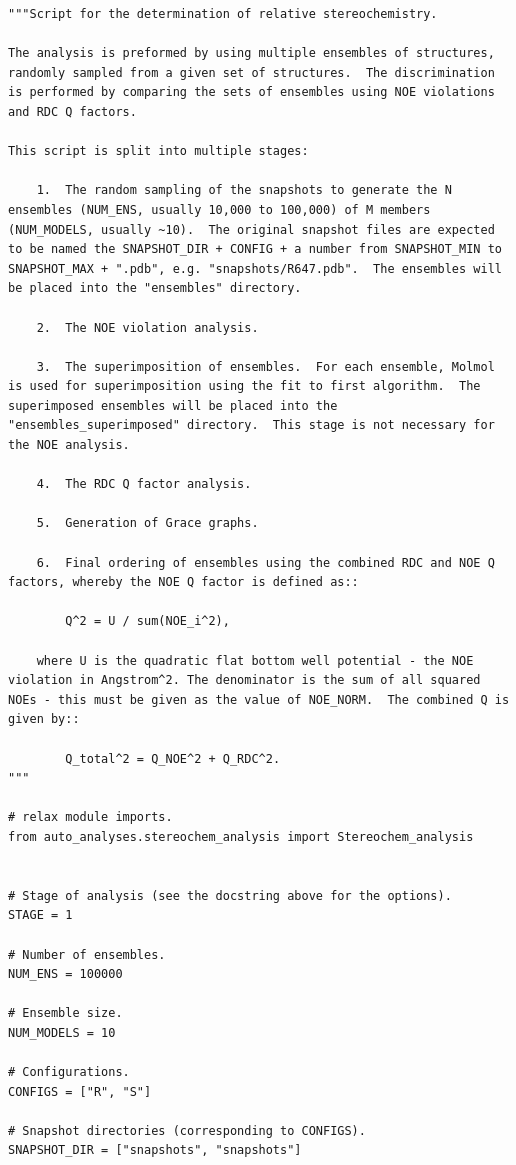 \begin{lstlisting}
"""Script for the determination of relative stereochemistry.

The analysis is preformed by using multiple ensembles of structures, randomly sampled from a given set of structures.  The discrimination is performed by comparing the sets of ensembles using NOE violations and RDC Q factors.

This script is split into multiple stages:

    1.  The random sampling of the snapshots to generate the N ensembles (NUM_ENS, usually 10,000 to 100,000) of M members (NUM_MODELS, usually ~10).  The original snapshot files are expected to be named the SNAPSHOT_DIR + CONFIG + a number from SNAPSHOT_MIN to SNAPSHOT_MAX + ".pdb", e.g. "snapshots/R647.pdb".  The ensembles will be placed into the "ensembles" directory.

    2.  The NOE violation analysis.

    3.  The superimposition of ensembles.  For each ensemble, Molmol is used for superimposition using the fit to first algorithm.  The superimposed ensembles will be placed into the "ensembles_superimposed" directory.  This stage is not necessary for the NOE analysis.

    4.  The RDC Q factor analysis.

    5.  Generation of Grace graphs.

    6.  Final ordering of ensembles using the combined RDC and NOE Q factors, whereby the NOE Q factor is defined as::

        Q^2 = U / sum(NOE_i^2),

    where U is the quadratic flat bottom well potential - the NOE violation in Angstrom^2. The denominator is the sum of all squared NOEs - this must be given as the value of NOE_NORM.  The combined Q is given by::

        Q_total^2 = Q_NOE^2 + Q_RDC^2.
"""

# relax module imports.
from auto_analyses.stereochem_analysis import Stereochem_analysis


# Stage of analysis (see the docstring above for the options).
STAGE = 1

# Number of ensembles.
NUM_ENS = 100000

# Ensemble size.
NUM_MODELS = 10

# Configurations.
CONFIGS = ["R", "S"]

# Snapshot directories (corresponding to CONFIGS).
SNAPSHOT_DIR = ["snapshots", "snapshots"]


\end{lstlisting}
